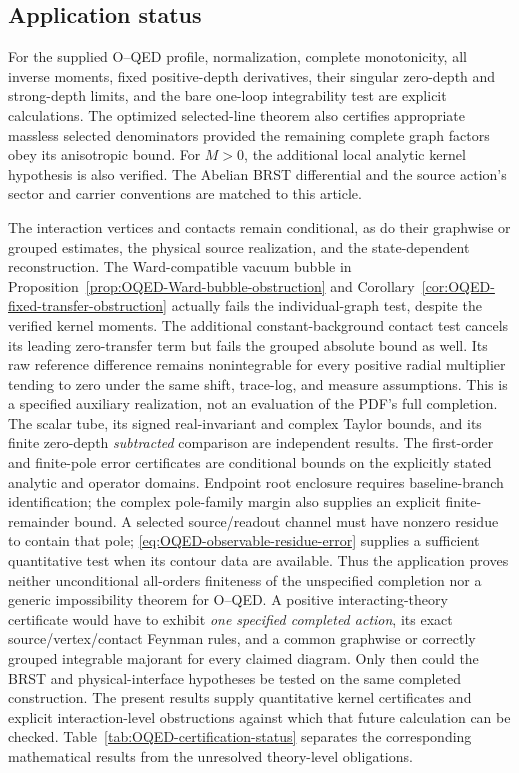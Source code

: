 \documentclass[final,5p,times,twocolumn,numbers,nopreprintline]{elsarticle}
\numberwithin{equation}{section}
\theoremstyle{definition}
\theoremstyle{remark}
\begin{document}
\subsection{Application status}
\label{sec:OQED-status}

For the supplied O--QED profile, normalization, complete monotonicity,
all inverse moments, fixed positive-depth derivatives, their singular
zero-depth and strong-depth limits, and the bare one-loop integrability
test are explicit calculations. The optimized selected-line theorem
also certifies appropriate massless selected denominators provided
the remaining complete graph factors obey its anisotropic bound. For
\(M>0\), the additional local analytic kernel hypothesis is also
verified. The Abelian BRST differential and the source action's sector
and carrier conventions are matched to this article.

The interaction vertices and contacts remain conditional, as do their
graphwise or grouped estimates, the physical source realization, and
the state-dependent reconstruction. The Ward-compatible vacuum bubble in
Proposition~\ref{prop:OQED-Ward-bubble-obstruction} and
Corollary~\ref{cor:OQED-fixed-transfer-obstruction} actually fails the
individual-graph test, despite the verified kernel moments. The additional
constant-background contact test cancels its leading zero-transfer
term but fails the grouped absolute bound as well. Its raw reference
difference remains nonintegrable for every positive radial multiplier
tending to zero under the same shift, trace-log, and measure assumptions.
This is a specified auxiliary realization, not an evaluation of the
PDF's full completion. The scalar tube, its signed real-invariant and
complex Taylor bounds, and its finite zero-depth \emph{subtracted}
comparison are independent results. The first-order and finite-pole
error certificates are conditional bounds on the explicitly stated
analytic and operator domains. Endpoint root enclosure
requires baseline-branch identification; the complex pole-family
margin also supplies an explicit finite-remainder bound. A selected
source/readout channel must have nonzero residue to contain that pole;
\eqref{eq:OQED-observable-residue-error} supplies a sufficient quantitative
test when its contour data are available. Thus the application proves neither unconditional all-orders
finiteness of the unspecified completion nor a generic impossibility
theorem for O--QED. A positive interacting-theory certificate would
have to exhibit \emph{one specified completed action}, its exact
source/vertex/contact Feynman rules, and a common graphwise or
correctly grouped integrable majorant for every claimed diagram.
Only then could the BRST and physical-interface hypotheses be tested
on the same completed construction. The present results supply
quantitative kernel certificates and explicit interaction-level
obstructions against which that future calculation can be checked.
Table~\ref{tab:OQED-certification-status} separates the corresponding
mathematical results from the unresolved theory-level obligations.
\end{document}
